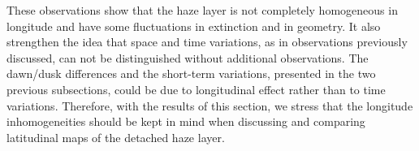 These observations show that the haze layer is not completely homogeneous in longitude and have some
fluctuations in extinction and in geometry.
It also strengthen the idea that space and time variations, as in observations previously discussed,
can not be distinguished without additional observations. The dawn/dusk differences and the short-term variations,
presented in the two previous subsections, could be due to longitudinal effect rather than to time variations.
Therefore, with the results of this section, we stress that the longitude inhomogeneities should be kept
in mind when discussing and comparing latitudinal maps of the detached haze layer.